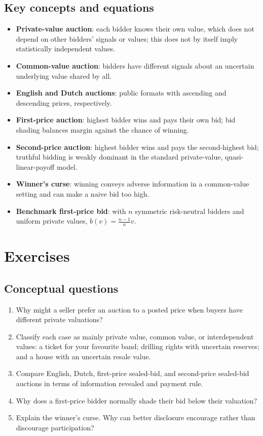 \subsection*{Key concepts and equations}
\begin{itemize}
  \item \textbf{Private-value auction}: each bidder knows their own value,
  which does not depend on other bidders' signals or values; this does not by
  itself imply statistically independent values.
  \item \textbf{Common-value auction}: bidders have different signals about an uncertain underlying value shared by all.
  \item \textbf{English and Dutch auctions}: public formats with ascending and descending prices, respectively.
  \item \textbf{First-price auction}: highest bidder wins and pays their own bid; bid shading balances margin against the chance of winning.
  \item \textbf{Second-price auction}: highest bidder wins and pays the
  second-highest bid; truthful bidding is weakly dominant in the standard
  private-value, quasi-linear-payoff model.
  \item \textbf{Winner's curse}: winning conveys adverse information in a common-value setting and can make a naive bid too high.
  \item \textbf{Benchmark first-price bid}: with \(n\) symmetric risk-neutral bidders and uniform private values, \(b(v)=\frac{n-1}{n}v\).
\end{itemize}

\section*{Exercises}

\subsection*{Conceptual questions}
\begin{enumerate}[label=\arabic*.]
  \item Why might a seller prefer an auction to a posted price when buyers have different private valuations?
  \item Classify each case as mainly private value, common value, or interdependent values: a ticket for your favourite band; drilling rights with uncertain reserves; and a house with an uncertain resale value.
  \item Compare English, Dutch, first-price sealed-bid, and second-price sealed-bid auctions in terms of information revealed and payment rule.
  \item Why does a first-price bidder normally shade their bid below their valuation?
  \item Explain the winner's curse. Why can better disclosure encourage rather than discourage participation?
\end{enumerate}

